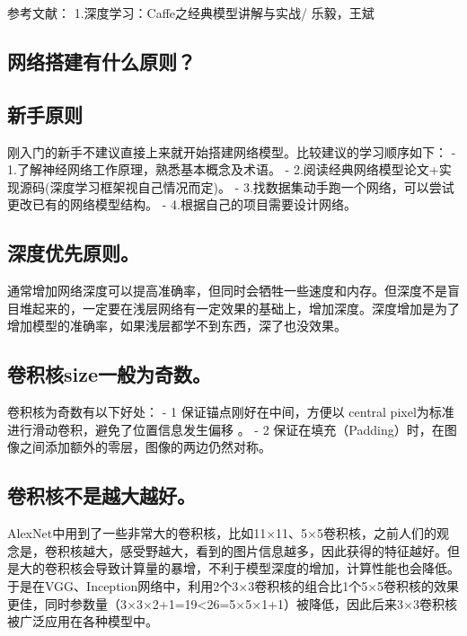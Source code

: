 参考文献： 1.深度学习：Caffe之经典模型讲解与实战/ 乐毅，王斌

\subsection{网络搭建有什么原则？}\label{ux7f51ux7edcux642dux5efaux6709ux4ec0ux4e48ux539fux5219}

\subsection{新手原则}\label{ux65b0ux624bux539fux5219}

刚入门的新手不建议直接上来就开始搭建网络模型。比较建议的学习顺序如下： -
1.了解神经网络工作原理，熟悉基本概念及术语。 -
2.阅读经典网络模型论文+实现源码(深度学习框架视自己情况而定)。 -
3.找数据集动手跑一个网络，可以尝试更改已有的网络模型结构。 -
4.根据自己的项目需要设计网络。

\subsection{深度优先原则。}\label{ux6df1ux5ea6ux4f18ux5148ux539fux5219}

通常增加网络深度可以提高准确率，但同时会牺牲一些速度和内存。但深度不是盲目堆起来的，一定要在浅层网络有一定效果的基础上，增加深度。深度增加是为了增加模型的准确率，如果浅层都学不到东西，深了也没效果。

\subsection{卷积核size一般为奇数。}\label{ux5377ux79efux6838sizeux4e00ux822cux4e3aux5947ux6570}

卷积核为奇数有以下好处： - 1 保证锚点刚好在中间，方便以 central
pixel为标准进行滑动卷积，避免了位置信息发生偏移 。 - 2
保证在填充（Padding）时，在图像之间添加额外的零层，图像的两边仍然对称。

\subsection{卷积核不是越大越好。}\label{ux5377ux79efux6838ux4e0dux662fux8d8aux5927ux8d8aux597d}

AlexNet中用到了一些非常大的卷积核，比如11×11、5×5卷积核，之前人们的观念是，卷积核越大，感受野越大，看到的图片信息越多，因此获得的特征越好。但是大的卷积核会导致计算量的暴增，不利于模型深度的增加，计算性能也会降低。于是在VGG、Inception网络中，利用2个3×3卷积核的组合比1个5×5卷积核的效果更佳，同时参数量（3×3×2+1=19\textless{}26=5×5×1+1）被降低，因此后来3×3卷积核被广泛应用在各种模型中。

